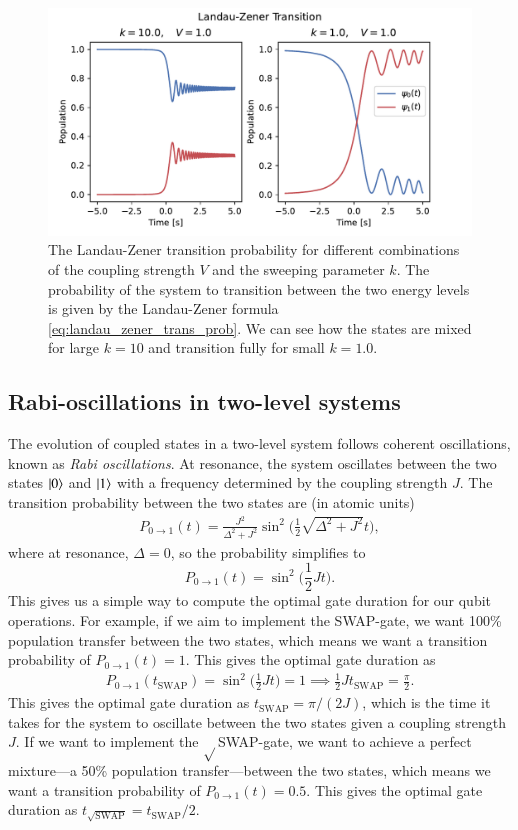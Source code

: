 \documentclass{subfiles}
\begin{document}
\begin{figure}[h!]
    \centering
    \includegraphics[width=1.0\textwidth]{figs/landau_zener.pdf}
    \caption{The Landau-Zener transition probability for different combinations of the coupling strength $V$ and the sweeping parameter $k$. The probability of the system to transition between the two energy levels is given by the Landau-Zener formula \eqref{eq:landau_zener_trans_prob}. We can see how the states are mixed for large $k=10$ and transition fully for small $k=1.0$.}
    \label{fig:landau_zener}
\end{figure} 

\subsection{Rabi-oscillations in two-level systems}
The evolution of coupled states in a two-level system follows coherent oscillations, known as \emph{Rabi oscillations}\cite{nielsen2010quantum, sakurai1986modern}. At resonance, the system oscillates between the two states $\ket{0}$ and $\ket{1}$ with a frequency determined by the coupling strength $J$. The transition probability between the two states are (in atomic units)
\begin{align*}
    P_{0\to1}(t) = \frac{J^2}{\Delta^2 + J^2}\sin^2\bigg(\frac{1}{2}\sqrt{\Delta^2 + J^2}t\bigg),
\end{align*} 
where at resonance, $\Delta = 0$, so the probability simplifies to
\begin{equation}
    P_{0\to1}(t) = \sin^2\bigg(\frac{1}{2}Jt\bigg).\label{eq:rabi_oscillation}
\end{equation}
This gives us a simple way to compute the optimal gate duration for our qubit operations. For example, if we aim to implement the SWAP-gate, we want 100\% population transfer between the two states, which means we want a transition probability of $P_{0\to1}(t) = 1$. This gives the optimal gate duration as
\begin{align*}
    P_{0\to1}(t_{\text{SWAP}}) = \sin^2\bigg(\frac{1}{2}Jt\bigg) = 1 \implies \frac{1}{2}Jt_{\text{SWAP}} = \frac{\pi}{2}.
\end{align*}
This gives the optimal gate duration as $t_{\text{SWAP}} = \pi/ (2 J)$, which is the time it takes for the system to oscillate between the two states given a coupling strength $J$. If we want to implement the $\sqrt{}$SWAP-gate, we want to achieve a perfect mixture—a 50\% population transfer—between the two states, which means we want a transition probability of $P_{0\to1}(t) = 0.5$. This gives the optimal gate duration as $t_{\sqrt{\text{SWAP}}} =  t_{\text{SWAP}}/2$.
\end{document}
